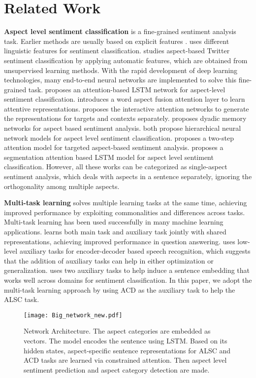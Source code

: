 \section{Related Work}
{\bf Aspect level sentiment classification} is a fine-grained sentiment analysis task. Earlier methods are usually based on explicit features \cite{liu2010improving,Vo2015Target}. \cite{liu2010improving} uses different linguistic features for sentiment classification. \cite{Vo2015Target} studies aspect-based Twitter sentiment classification by applying automatic features, which are obtained from unsupervised learning methods. With the rapid development of deep learning technologies, many end-to-end neural networks are implemented to solve this fine-grained task. \cite{Wang2016Attention} proposes an attention-based LSTM network for aspect-level sentiment
classification. \cite{Tay2017Learning} introduces a word aspect fusion attention layer to learn attentive representations. \cite{Ma2017Interactive} proposes the interactive attention
networks to generate the representations for targets and contexts separately. \cite{tay2017dyadic} proposes dyadic memory networks for aspect based sentiment analysis. \cite{cheng2017aspect,ruder2016hierarchical} both propose hierarchical neural network models for aspect level sentiment classification. \cite{ma2018targeted} proposes a two-step attention model for targeted aspect-based sentiment analysis. \cite{wang2018learning} proposes a segmentation
attention based LSTM model for aspect level sentiment classification. However, all these works can be categorized as single-aspect sentiment analysis, which deals with aspects in a sentence separately, ignoring the orthogonality among multiple aspects. 

{\bf Multi-task learning} \cite{Caruana1997Multitask} solves multiple learning tasks at the same time, achieving improved performance by exploiting commonalities and differences across tasks. Multi-task learning has been used successfully in many  machine learning applications. \cite{Huang2018Multitask} learns both main task and auxiliary task jointly with shared representations, achieving improved performance in question answering. \cite{Toshniwal2017Multitask} uses low-level auxiliary tasks
for encoder-decoder based speech recognition, which suggests that the addition of auxiliary tasks can help in either optimization or generalization. \cite{yu2016learning} uses two auxiliary tasks to help induce a sentence embedding that works well across domains for sentiment classification. In this paper, we adopt the multi-task learning approach by using ACD as the auxiliary task to help the ALSC task. 
\begin{figure*}
\setlength{\abovecaptionskip}{0.2cm}   %
\setlength{\belowcaptionskip}{-0.3cm}   %
\centering
	\texttt{[image: Big\_network\_new.pdf]}
    \caption{Network Architecture. The aspect categories are embedded as vectors. The model encodes the sentence using LSTM. Based on its hidden states, aspect-specific sentence representations for ALSC and ACD tasks are learned via constrained attention. Then aspect level sentiment prediction and aspect category detection are made. }
    \label{network}
\end{figure*}
